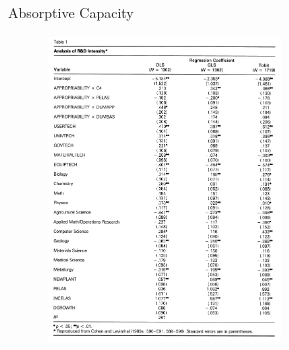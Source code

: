 \documentclass{beamer}
\begin{document}
\begin{frame}{Absorptive Capacity}{}
\begin{figure}[h]
\begin{centering}
  \includegraphics[width=0.55\textwidth]{0403}
   \label{fig:0403}
\end{centering}
\end{figure}
\end{frame}



\end{document}
